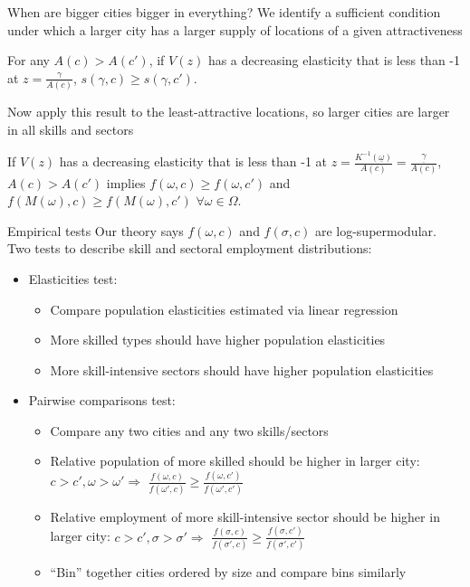 \documentclass[10pt,notes=hide]{beamer}
\begin{document}
\begin{frame}{When are bigger cities bigger in everything?}
We identify a sufficient condition under which a larger city has a
larger supply of locations of a given attractiveness
\begin{proposition}
\label{prop:AbsoluteSize}For any $A(c)>A(c')$, if $V(z)$ has a
decreasing elasticity that is less than -1 at $z=\frac{\gamma}{A(c)}$,
$s(\gamma,c)\geq s(\gamma,c')$.
\end{proposition}
Now apply this result to the least-attractive locations, so larger
cities are larger in all skills and sectors
\begin{corollary}
\label{cor:AbsoluteSize}If $V(z)$ has a decreasing elasticity that
is less than -1 at $z=\frac{K^{-1}(\underline{\omega})}{A(c)}=\frac{\underline{\gamma}}{A(c)}$,
$A(c)>A(c')$ implies $f(\omega,c)\geq f(\omega,c')$ and $f(M(\omega),c)\geq f(M(\omega),c')$
$\forall\omega\in\Omega$.
\end{corollary}
\end{frame}
\begin{frame}{Empirical tests}
Our theory says $f(\omega,c)$ and $f(\sigma,c)$ are log-supermodular. 
Two tests to describe skill and sectoral employment distributions:
\begin{itemize}
\item Elasticities test: 
\begin{itemize}
\item Compare population elasticities estimated via linear regression
\item More skilled types should have higher population elasticities
\item More skill-intensive sectors should have higher population elasticities
\end{itemize}
\item Pairwise comparisons test:
\begin{itemize}
\item Compare any two cities and any two skills/sectors
\item Relative population of more skilled should be higher in larger city:
$c>c',\omega>\omega'\Rightarrow$ $\frac{f(\omega,c)}{f(\omega',c)}\geq\frac{f(\omega,c')}{f(\omega',c')}$
\item Relative employment of more skill-intensive sector should be higher
in larger city: $c>c',\sigma>\sigma'\Rightarrow$ $\frac{f(\sigma,c)}{f(\sigma',c)}\geq\frac{f(\sigma,c')}{f(\sigma',c')}$
\item ``Bin'' together cities ordered by size and compare bins similarly
\end{itemize}
\end{itemize}
\end{frame}
\end{document}
